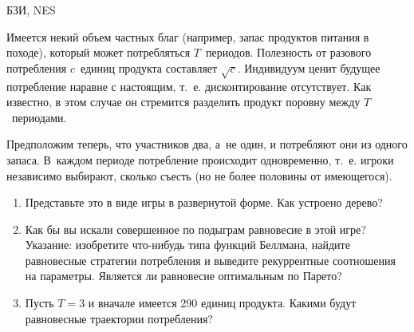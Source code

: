 \begin{problem}
\begin{source}
БЗИ, NES
\end{source}

Имеется некий объем частных благ (например,
запас продуктов питания в походе), который может
потребляться $T$~периодов. Полезность от разового
потребления $c$~единиц продукта составляет $\sqrt{c}$.
Индивидуум ценит будущее потребление наравне с настоящим,
т.~е. дисконтирование отсутствует. Как известно, в этом
случае он стремится разделить продукт поровну между
$T$~периодами.

Предположим теперь, что участников два, а~не один, и
потребляют они из одного запаса. В~каждом периоде
потребление происходит одновременно, т.~е. игроки
независимо выбирают, сколько съесть (но не более половины
от имеющегося).

\begin{enumerate}

\item Представьте это в виде игры в развернутой форме. Как
устроено дерево?

\item Как бы вы искали совершенное по подыграм равновесие в
этой игре? Указание: изобретите что-нибудь типа функций
Беллмана, найдите равновесные стратегии потребления и
выведите рекуррентные соотношения на параметры. Является ли
равновесие оптимальным по Парето?

\item Пусть $T=3$ и вначале имеется 290 единиц продукта.
Какими будут равновесные траектории потребления?

\end{enumerate}







\begin{sol}

\end{sol}
\end{problem}






